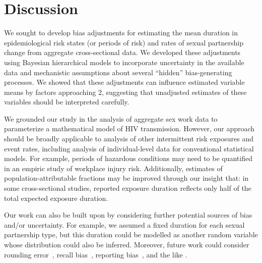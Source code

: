 \section{Discussion}
We sought to develop bias adjustments for estimating
the mean duration in epidemiological risk states (or periods of risk)
and rates of sexual partnership change
from aggregate cross-sectional data.
We developed these adjustments using Bayesian hierarchical models to incorporate
uncertainty in the available data and mechanistic assumptions about
several ``hidden'' bias-generating processes.
We showed that these adjustments can influence estimated variable means by factors approaching 2,
suggesting that unadjusted estimates of these variables should be interpreted carefully.
\par
We grounded our study in the analysis of aggregate sex work data
to parameterize a mathematical model of HIV transmission.
However, our approach should be broadly applicable to
analysis of other intermittent risk exposures and event rates,
including analysis of individual-level data for conventional statistical models.
For example, periods of hazardous conditions may need to be quantified
in an empiric study of workplace injury risk.
Additionally, estimates of population-attributable fractions
may be improved through our insight that: in some cross-sectional studies,
reported exposure duration reflects only half of the total expected exposure duration.
\par
Our work can also be built upon by considering
further potential sources of bias and/or uncertainty.
For example, we assumed a fixed duration for each sexual partnership type,
but this duration could be modelled as another random variable
whose distribution could also be inferred.
Moreover, future work could consider
rounding error~\cite{Mills2014},
recall bias~\cite{Ramjee1999},
reporting bias~\cite{Lowndes2012},
and the like \cite{Fenton2001}.
